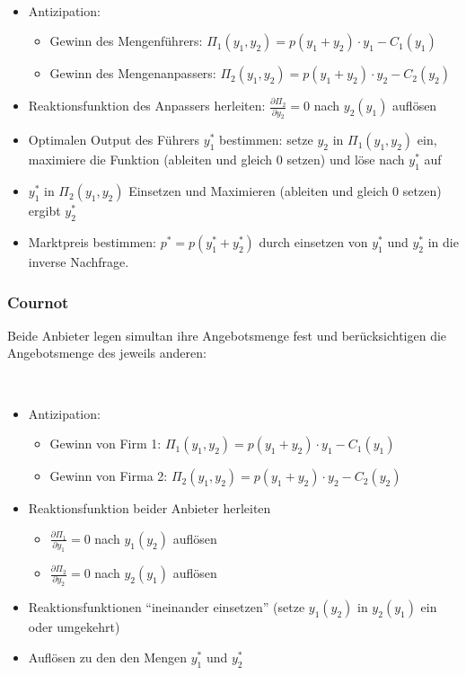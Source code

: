\begin{kr} ~\
	\begin{itemize}
		\item Antizipation:
			\begin{itemize}
				\item Gewinn des Mengenführers: $\Pi_1(y_1, y_2) = p(y_1 + y_2) \cdot y_1 - C_1(y_1)$
				\item Gewinn des Mengenanpassers: $\Pi_2(y_1, y_2) = p(y_1 + y_2) \cdot y_2 - C_2(y_2)$
			\end{itemize}
		\item Reaktionsfunktion des Anpassers herleiten: $\frac{\partial \Pi_2}{\partial y_2} = 0$ nach $y_2(y_1)$ auflösen
		\item Optimalen Output des Führers $y_1^*$ bestimmen: setze $y_2$ in $\Pi_1(y_1, y_2)$ ein, maximiere die Funktion (ableiten und gleich 0 setzen) und löse nach $y_1^*$ auf
		\item $y_1^*$ in $\Pi_2(y_1, y_2)$ Einsetzen und Maximieren (ableiten und gleich 0 setzen) ergibt $y_2^*$
		\item Marktpreis bestimmen: $p^* = p(y_1^* + y_2^*)$ durch einsetzen von $y_1^*$ und $y_2^*$ in die inverse Nachfrage.
	\end{itemize}
\end{kr}

\subsubsection*{Cournot} %

Beide Anbieter legen simultan ihre Angebotsmenge fest und berücksichtigen die Angebotsmenge des jeweils anderen:

\begin{kr}[Cournot] ~\
	\begin{itemize}
		\item Antizipation:
			\begin{itemize}
				\item Gewinn von Firm 1: $\Pi_1(y_1, y_2) = p(y_1 + y_2) \cdot y_1 - C_1(y_1)$
				\item Gewinn von Firma 2: $\Pi_2(y_1, y_2) = p(y_1 + y_2) \cdot y_2 - C_2(y_2)$
			\end{itemize}
		\item Reaktionsfunktion beider Anbieter herleiten	
			\begin{itemize}
				\item $\frac{\partial \Pi_1}{\partial y_1} = 0$ nach $y_1(y_2)$ auflösen
				\item $\frac{\partial \Pi_2}{\partial y_2} = 0$ nach $y_2(y_1)$ auflösen
			\end{itemize}
		\item Reaktionsfunktionen \enquote{ineinander einsetzen} (setze $y_1(y_2)$ in $y_2(y_1)$ ein oder umgekehrt)
		\item Auflösen zu den den Mengen $y_1^*$ und $y_2^*$
	\end{itemize}
\end{kr}

